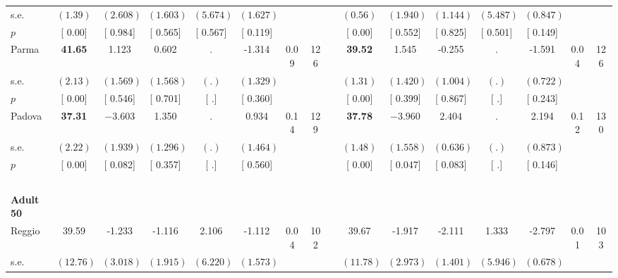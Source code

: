 \begin{longtable}{L{8em} c c c c c c c p{1em} c c c c c c c}
\quad \quad \quad \quad s.e.& $ (     1.39)$ & $ (    2.608)$ & $ (    1.603)$ & $ (    5.674)$ & $ (    1.627)$ & & & & $ (     0.56)$ & $ (    1.940)$ & $ (    1.144)$ & $ (    5.487)$ & $ (    0.847)$ & &  \\*
\quad \quad \quad \quad $ p$ & [     0.00] & [    0.984] & [    0.565] & [    0.567] & [    0.119] & & & & [     0.00] & [    0.552] & [    0.825] & [    0.501] & [    0.149] & &  \\[1em]
\quad \quad \quad Parma& \textbf{    41.65} &     1.123 &     0.602 &         . &    -1.314 &      0.09 &       126 & & \textbf{    39.52} &     1.545 &    -0.255 &         . &    -1.591 &      0.04 &       126  \\*
\quad \quad \quad \quad s.e.& $ (     2.13)$ & $ (    1.569)$ & $ (    1.568)$ & $ (        .)$ & $ (    1.329)$ & & & & $ (     1.31)$ & $ (    1.420)$ & $ (    1.004)$ & $ (        .)$ & $ (    0.722)$ & &  \\*
\quad \quad \quad \quad $ p$ & [     0.00] & [    0.546] & [    0.701] & [        .] & [    0.360] & & & & [     0.00] & [    0.399] & [    0.867] & [        .] & [    0.243] & &  \\[1em]
\quad \quad \quad Padova& \textbf{    37.31} & $ \mathbf{   -3.603}$ &     1.350 &         . &     0.934 &      0.14 &       129 & & \textbf{    37.78} & $ \mathbf{   -3.960}$ & $ \mathbf{    2.404}$ &         . &     2.194 &      0.12 &       130  \\*
\quad \quad \quad \quad s.e.& $ (     2.22)$ & $ (    1.939)$ & $ (    1.296)$ & $ (        .)$ & $ (    1.464)$ & & & & $ (     1.48)$ & $ (    1.558)$ & $ (    0.636)$ & $ (        .)$ & $ (    0.873)$ & &  \\*
\quad \quad \quad \quad $ p$ & [     0.00] & [    0.082] & [    0.357] & [        .] & [    0.560] & & & & [     0.00] & [    0.047] & [    0.083] & [        .] & [    0.146] & &  \\[1em]
~\\[1em]
\quad \quad \textbf{Adult 50} & & & & & & & & & & & & & & & \\* 
\quad \quad \quad Reggio& 39.59 &    -1.233 &    -1.116 &     2.106 &    -1.112 &      0.04 &       102 & & 39.67 &    -1.917 &    -2.111 &     1.333 &    -2.797 &      0.01 &       103  \\*
\quad \quad \quad \quad s.e.& $ (    12.76)$ & $ (    3.018)$ & $ (    1.915)$ & $ (    6.220)$ & $ (    1.573)$ & & & & $ (    11.78)$ & $ (    2.973)$ & $ (    1.401)$ & $ (    5.946)$ & $ (    0.678)$ & &  \\*

\end{longtable}

